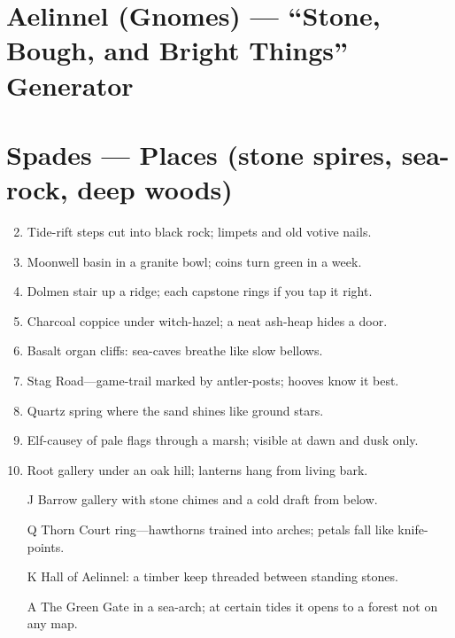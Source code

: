 \section{Aelinnel (Gnomes) --- ``Stone, Bough, and Bright Things'' Generator}
\label{chap:aelinnel}

\section*{Spades --- Places (stone spires, sea-rock, deep woods)}
\label{sec:aelinnel-places}
\begin{enumerate}
\setcounter{enumi}{1}
\item Tide-rift steps cut into black rock; limpets and old votive nails.
\item Moonwell basin in a granite bowl; coins turn green in a week.
\item Dolmen stair up a ridge; each capstone rings if you tap it right.
\item Charcoal coppice under witch-hazel; a neat ash-heap hides a door.
\item Basalt organ cliffs: sea-caves breathe like slow bellows.
\item Stag Road---game-trail marked by antler-posts; hooves know it best.
\item Quartz spring where the sand shines like ground stars.
\item Elf-causey of pale flags through a marsh; visible at dawn and dusk only.
\item Root gallery under an oak hill; lanterns hang from living bark.
\item[J] Barrow gallery with stone chimes and a cold draft from below.
\item[Q] Thorn Court ring---hawthorns trained into arches; petals fall like knife-points.
\item[K] Hall of Aelinnel: a timber keep threaded between standing stones.
\item[A] The Green Gate in a sea-arch; at certain tides it opens to a forest not on any map.
\end{enumerate}

